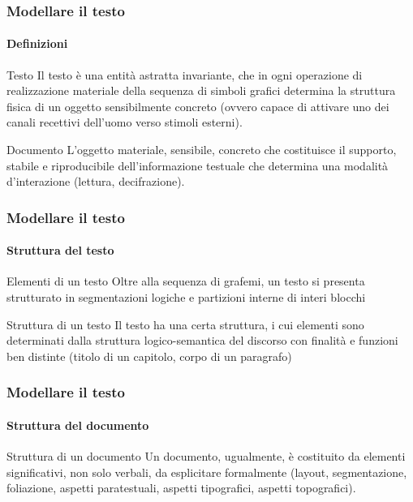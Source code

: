 \begin{frame}
	\frametitle{Modellare il testo}
	\framesubtitle{Definizioni}
	\addtocounter{nframe}{1}

	\begin{block}{Testo}
		Il testo è una entità astratta invariante, che in ogni operazione di realizzazione materiale della sequenza di simboli grafici determina la struttura fisica di un oggetto sensibilmente concreto (ovvero capace di attivare uno dei canali recettivi dell’uomo verso stimoli esterni).
	\end{block}

	\begin{block}{Documento}
		L'oggetto materiale, sensibile, concreto che costituisce il supporto, stabile e riproducibile dell’informazione testuale che determina una modalità d’interazione (lettura, decifrazione).
	\end{block}

\end{frame}

\begin{frame}
	\frametitle{Modellare il testo}
	\framesubtitle{Struttura del testo}
	\addtocounter{nframe}{1}

	\begin{block}{Elementi di un testo}
		Oltre alla sequenza di grafemi, un testo si presenta strutturato in segmentazioni logiche e partizioni interne di interi blocchi
	\end{block}

	\begin{block}{Struttura di un testo}
		Il testo ha una certa struttura, i cui elementi sono determinati dalla struttura logico-semantica del discorso con finalità e funzioni ben distinte (titolo di un capitolo, corpo di un paragrafo)
	\end{block}

\end{frame}

\begin{frame}
	\frametitle{Modellare il testo}
	\framesubtitle{Struttura del documento}
	\addtocounter{nframe}{1}

	\begin{block}{Struttura di un documento}
		Un documento, ugualmente, è costituito da elementi significativi, non solo verbali, da esplicitare formalmente (layout, segmentazione, foliazione, aspetti paratestuali, aspetti tipografici, aspetti topografici).
	\end{block}

\end{frame}


